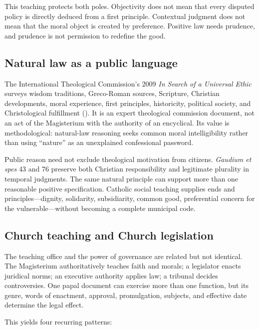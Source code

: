 This teaching protects both poles. Objectivity does not mean that every disputed policy is directly deduced from a first principle. Contextual judgment does not mean that the moral object is created by preference. Positive law needs prudence, and prudence is not permission to redefine the good.

\subsection{Natural law as a public language}

The International Theological Commission's 2009 \emph{In Search of a Universal Ethic} surveys wisdom traditions, Greco-Roman sources, Scripture, Christian developments, moral experience, first principles, historicity, political society, and Christological fulfillment (). It is an expert theological commission document, not an act of the Magisterium with the authority of an encyclical. Its value is methodological: natural-law reasoning seeks common moral intelligibility rather than using ``nature'' as an unexplained confessional password.

Public reason need not exclude theological motivation from citizens. \emph{Gaudium et spes} 43 and 76 preserve both Christian responsibility and legitimate plurality in temporal judgments. The same natural principle can support more than one reasonable positive specification. Catholic social teaching supplies ends and principles---dignity, solidarity, subsidiarity, common good, preferential concern for the vulnerable---without becoming a complete municipal code.

\subsection{Church teaching and Church legislation}

The teaching office and the power of governance are related but not identical. The Magisterium authoritatively teaches faith and morals; a legislator enacts juridical norms; an executive authority applies law; a tribunal decides controversies. One papal document can exercise more than one function, but its genre, words of enactment, approval, promulgation, subjects, and effective date determine the legal effect.

This yields four recurring patterns:

